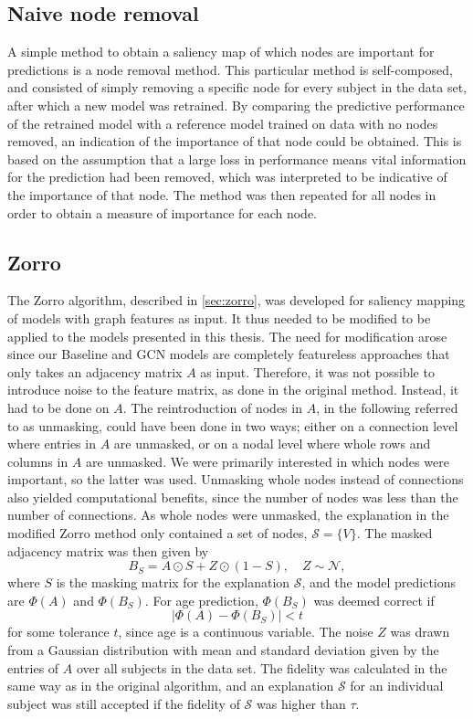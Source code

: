 \subsection{Naive node removal}
A simple method to obtain a saliency map of which nodes are important for predictions is a node removal method. This particular method is self-composed, and consisted of simply removing a specific node for every subject in the data set, after which a new model was retrained. By comparing the predictive performance of the retrained model with a reference model trained on data with no nodes removed, an indication of the importance of that node could be obtained. This is based on the assumption that a large loss in performance means vital information for the prediction had been removed, which was interpreted to be indicative of the importance of that node. The method was then repeated for all nodes in order to obtain a measure of importance for each node.


\subsection{Zorro}

The Zorro algorithm, described in \cref{sec:zorro}, was developed for saliency mapping of models with graph features as input. It thus needed to be modified to be applied to the models presented in this thesis. The need for modification arose since our Baseline and GCN models are completely featureless approaches that only takes an adjacency matrix $A$ as input. Therefore, it was not possible to introduce noise to the feature matrix, as done in the original method. Instead, it had to be done on $A$. The reintroduction of nodes in $A$, in the following referred to as unmasking, could have been done in two ways; either on a connection level where entries in $A$ are unmasked, or on a nodal level where whole rows and columns in $A$ are unmasked. We were primarily interested in which nodes were important, so the latter was used. Unmasking whole nodes instead of connections also yielded computational benefits, since the number of nodes was less than the number of connections. As whole nodes were unmasked, the explanation in the modified Zorro method only contained a set of nodes, $\mathcal{S} = \{V\}$. The masked adjacency matrix was then given by 
\begin{equation}
    B_S = A \odot S + Z \odot (1- S), \quad Z \sim \mathcal{N},
\end{equation}
where $S$ is the masking matrix for the explanation $\mathcal{S}$, and the model predictions are $\Phi(A)$ and $\Phi(B_S)$. For age prediction, $\Phi(B_S)$ was deemed correct if 
\begin{equation}
    \left|\Phi(A) - \Phi(B_S)\right| < t
\end{equation}
for some tolerance $t$, since age is a continuous variable. The noise $Z$ was drawn from a Gaussian distribution with mean and standard deviation given by the entries of $A$ over all subjects in the data set. The fidelity was calculated in the same way as in the original algorithm, and an explanation $\mathcal{S}$ for an individual subject was still accepted if the fidelity of $\mathcal{S}$ was higher than $\tau$. 

